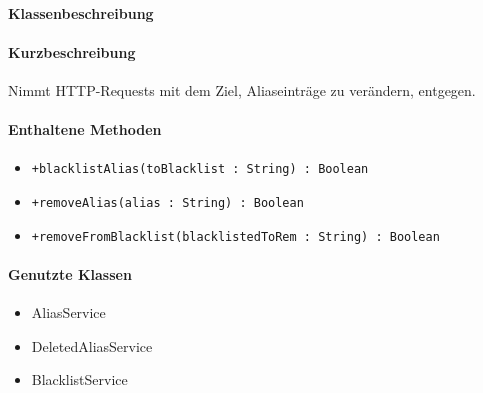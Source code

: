 \paragraph*{Klassenbeschreibung}%
\paragraph*{Kurzbeschreibung}
Nimmt HTTP-Requests mit dem Ziel, Aliaseinträge zu verändern, entgegen.
\paragraph*{Enthaltene Methoden}
\begin{itemize}
    \item \texttt{+blacklistAlias(toBlacklist : String) : Boolean}
    \item \texttt{+removeAlias(alias : String) : Boolean}
    \item \texttt{+removeFromBlacklist(blacklistedToRem : String) : Boolean}
\end{itemize}
\paragraph*{Genutzte Klassen}
\begin{itemize}
    \item AliasService
    \item DeletedAliasService
    \item BlacklistService
\end{itemize}